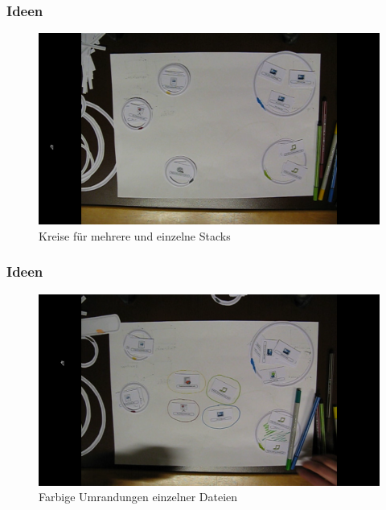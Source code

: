 \begin{frame}

\frametitle{Ideen}
\label{ideen}

\begin{figure}[htbp]
\centering
\includegraphics[keepaspectratio,width=\textwidth,height=0.75\textheight]{1_-_Kreise_fuer_mehrere_und_einzelne_Stacks.png}
\caption{Kreise für mehrere und einzelne Stacks}
\label{}
\end{figure}


\end{frame}

\begin{frame}

\frametitle{Ideen}
\label{ideen}

\begin{figure}[htbp]
\centering
\includegraphics[keepaspectratio,width=\textwidth,height=0.75\textheight]{Angy_-_Farbige_Umrandungen_einzelner_Dateien.png}
\caption{Farbige Umrandungen einzelner Dateien}
\label{}
\end{figure}


\end{frame}

